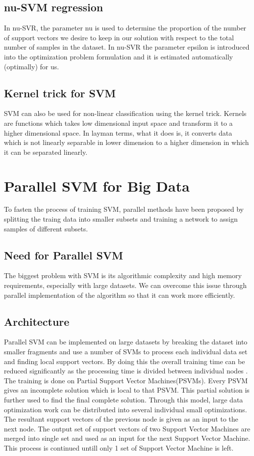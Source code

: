 \documentclass[sigconf]{acmart}
\begin{document}
\subsection{nu-SVM regression}
In nu-SVR, the parameter nu is used to determine the proportion of the number of support vectors we desire to keep in our solution with respect to the total number of samples in the dataset. In nu-SVR the parameter epsilon is introduced into the optimization problem formulation and it is estimated automatically (optimally) for us.

\subsection{Kernel trick for SVM}
SVM can also be used for non-linear classification using the kernel trick. Kernels are functions which takes low dimensional input space and transform it to a higher dimensional space. In layman terms, what it does is, it converts data which is not linearly separable in lower dimension to a higher dimension in which it can be separated linearly. 
\section{Parallel SVM for Big Data}
To fasten the process of training SVM, parallel methods have been proposed by splitting the traing data into smaller subsets and training a network to assign samples of different subsets.
\subsection{Need for Parallel SVM}
The biggest problem with SVM is its algorithmic complexity and high memory requirements, especially with large datasets. We can overcome this issue through parallel implementation of the algorithm so that it can work more efficiently.
\subsection{Architecture}
Parallel SVM can be implemented on large datasets by breaking the dataset into smaller fragments and use a number of SVMs to process each individual data set and finding local support vectors. By doing this the overall training time can be reduced significantly as the processing time is divided between individual nodes \cite{Psvm}.
\\
The training is done on Partial Support Vector Machines(PSVMs). Every PSVM gives an incomplete solution which is local to that PSVM. This partial solution is further used to find the final complete solution\cite{Psvm}. Through this model, large data optimization work can be distributed into several individual small optimizations. The resultant support vectors of the previous node is given as an input to the next node. The output set of support vectors of two Support Vector Machines are merged into single set and used as an input for the next Support Vector Machine. This process is continued untill only 1 set of Support Vector Machine is left.
\end{document}
